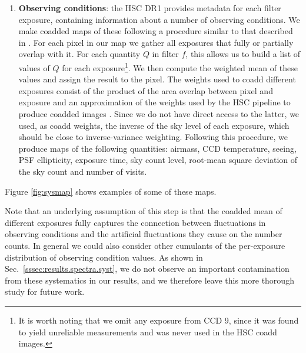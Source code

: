 \documentclass[a4paper,11pt]{article}
\begin{document}
\begin{enumerate}
      \item {\bf Observing conditions}: the HSC DR1 provides metadata for each filter exposure, containing information about a number of observing conditions. We make coadded maps of these following a procedure similar to that described in \cite{2016ApJS..226...24L}. For each pixel in our map we gather all exposures that fully or partially overlap with it. For each quantity $Q$ in filter $f$, this allows us to build a list of values of $Q$ for each exposure\footnote{It is worth noting that we omit any exposure from CCD 9, since it was found to yield unreliable measurements and was never used in the HSC coadd images.}. We then compute the weighted mean of these values and assign the result to the pixel. The weights used to coadd different exposures consist of the product of the area overlap between pixel and exposure and an approximation of the weights used by the HSC pipeline to produce coadded images \cite{2018PASJ...70S...5B}. Since we do not have direct access to the latter, we used, as coadd weights, the inverse of the sky level of each exposure, which should be close to inverse-variance weighting. Following this procedure, we produce maps of the following quantities: airmass, CCD temperature, seeing, PSF ellipticity, exposure time, sky count level, root-mean square deviation of the sky count and number of visits.
    \end{enumerate}
    Figure \ref{fig:sysmap} shows examples of some of these maps.
    
    Note that an underlying assumption of this step is that the coadded mean of different exposures fully captures the connection between fluctuations in observing conditions and the artificial fluctuations they cause on the number counts. In general we could also consider other cumulants of the per-exposure distribution of observing condition values. As shown in Sec.~\ref{sssec:results.spectra.syst}, we do not observe an important contamination from these systematics in our results, and we therefore leave this more thorough study for future work.
\end{document}
